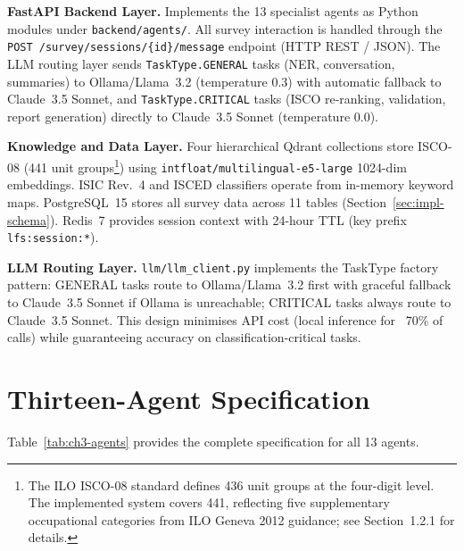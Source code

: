 \textbf{FastAPI Backend Layer.}
Implements the 13 specialist agents as Python modules under
\texttt{backend/agents/}.
All survey interaction is handled through the
\texttt{POST /\-survey/\-sessions/\-\{id\}/message} endpoint (HTTP REST / JSON).
The LLM routing layer sends \texttt{TaskType.GENERAL} tasks (NER, conversation,
summaries) to Ollama/Llama~3.2 (temperature 0.3) with automatic fallback to
Claude~3.5 Sonnet, and \texttt{TaskType.CRITICAL} tasks (ISCO re-ranking,
validation, report generation) directly to Claude~3.5 Sonnet (temperature 0.0).

\textbf{Knowledge and Data Layer.}
Four hierarchical Qdrant collections store ISCO-08 (441 unit groups\footnote{The ILO ISCO-08 standard defines 436 unit groups at the four-digit level. The implemented system covers 441, reflecting five supplementary occupational categories from ILO Geneva 2012 guidance; see Section~1.2.1 for details.}) using
\texttt{intfloat/\-multilingual-e5-large} 1024-dim embeddings.
ISIC Rev.~4 and ISCED classifiers operate from in-memory keyword maps.
PostgreSQL~15 stores all survey data across 11 tables (Section~\ref{sec:impl-schema}).
Redis~7 provides session context with 24-hour TTL (key prefix
\texttt{lfs:session:*}).

\textbf{LLM Routing Layer.}
\texttt{llm/llm\_client.py} implements the TaskType factory pattern:
GENERAL tasks route to Ollama/Llama~3.2 first with graceful fallback to
Claude~3.5 Sonnet if Ollama is unreachable;
CRITICAL tasks always route to Claude~3.5 Sonnet.
This design minimises API cost (local inference for ~70\% of calls) while
guaranteeing accuracy on classification-critical tasks.




\section{Thirteen-Agent Specification}
\label{sec:arch-agents}

Table~\ref{tab:ch3-agents} provides the complete specification for all 13 agents.

